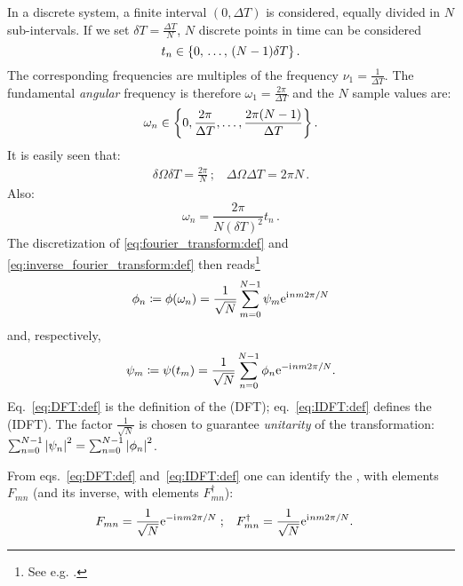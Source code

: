 In a discrete system, a finite interval $(0, \Delta{T})$ is considered,
equally divided in $N$ sub-intervals. If we set $\delta{T} = \frac{\Delta{T}}{N}$,
$N$ discrete points in time can be considered
\begin{equation}\label{eq:DFT:t_spectrum}
  t_n \in \left\{0,\,\hdots,\,(N-1)\delta{T}\right\} \text{.}
\end{equation} 
%
The corresponding frequencies are multiples of the  frequency $\nu_1 = \frac{1}{\Delta{T}}$.
The fundamental \emph{angular} frequency is therefore $\omega_1 = \frac{2\pi}{\Delta{T}}$ and the
$N$ sample values are:
\begin{equation}\label{eq:DFT:omega_spectrum}
  \omega_n \in \left\{0, \frac{2\pi}{\Delta{T}}, \dots, \frac{2\pi(N-1)}{\Delta{T}}\right\} \text{.}
\end{equation} 
%
It is easily seen that:
\begin{gather}\label{eq:DFT:deltas}
  \delta\Omega \delta T = \frac{2\pi}{N} \, \text{;} \quad
  \Delta\Omega \Delta T = 2\pi N \, \text{.}
\end{gather}
Also:
\begin{equation}\label{eq:DFT:eigenratio}
  \omega_{n} = \frac{2\pi}{N(\delta{T})^{2}} t_{n}  \, \text{.}
\end{equation}
%
The discretization
of \eqref{eq:fourier_transform:def} and \eqref{eq:inverse_fourier_transform:def}
then reads\footnote{
  See e.g.
  \cite{Oppenheim:Int1,Oppenheim:Int3,ProakisManolakis}.
}
\begin{equation}\label{eq:DFT:def}
  \phi_n \coloneqq \phi(\omega_n) = \frac{1}{\sqrt{N}} \sum_{m=0}^{N-1} \psi_m \mathrm{e}^{\mathrm{i}\mkern1mu n m 2 \pi / N}
\end{equation}
and, respectively,
\begin{equation}\label{eq:IDFT:def}
  \psi_m \coloneqq \psi(t_m) = \frac{1}{\sqrt{N}} \sum_{n=0}^{N-1} \phi_n \mathrm{e}^{-\mathrm{i}\mkern1mu n m 2 \pi / N} \text{.}
\end{equation}
%
Eq.~\eqref{eq:DFT:def} is the definition of the  (DFT);
eq.~\eqref{eq:IDFT:def} defines the  (IDFT).
%
The factor $\frac{1}{\sqrt{N}}$
is chosen to guarantee \emph{unitarity} of the transformation:
$\sum_{n=0}^{N-1} \abs{\psi_n}^2 = \sum_{n=0}^{N-1} \abs{\phi_n}^2$.

From eqs.~\eqref{eq:DFT:def} and~\eqref{eq:IDFT:def} one can identify the
, with elements $F_{mn}$
(and its inverse,
with elements $F_{mn}^{\dagger}$):
\begin{align}
  F_{mn}            &= \frac{1}{\sqrt{N}} \mathrm{e}^{-\mathrm{i}\mkern1mu n m 2 \pi / N} \;\text{;} &
  F_{mn}^{\dagger}  &= \frac{1}{\sqrt{N}} \mathrm{e}^{ \mathrm{i}\mkern1mu n m 2 \pi / N}
  \text{.}
\end{align}

